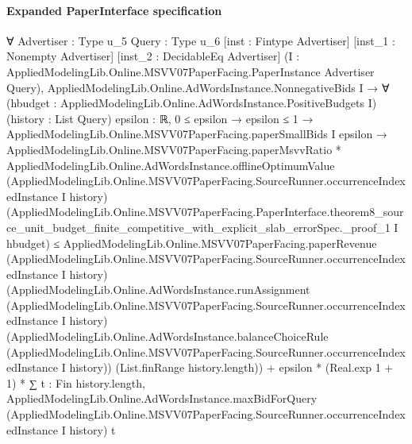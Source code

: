 \documentclass[10pt]{article}
\begin{document}
\paragraph{Expanded PaperInterface specification}
\begin{ReviewVerbatim}
∀ {Advertiser : Type u_5} {Query : Type u_6} [inst : Fintype Advertiser] [inst_1 : Nonempty Advertiser]
  [inst_2 : DecidableEq Advertiser] (I : AppliedModelingLib.Online.MSVV07PaperFacing.PaperInstance Advertiser Query),
  AppliedModelingLib.Online.AdWordsInstance.NonnegativeBids I →
    ∀ (hbudget : AppliedModelingLib.Online.AdWordsInstance.PositiveBudgets I) (history : List Query) {epsilon : ℝ},
      0 ≤ epsilon →
        epsilon ≤ 1 →
          AppliedModelingLib.Online.MSVV07PaperFacing.paperSmallBids I epsilon →
            AppliedModelingLib.Online.MSVV07PaperFacing.paperMsvvRatio *
                AppliedModelingLib.Online.AdWordsInstance.offlineOptimumValue
                  (AppliedModelingLib.Online.MSVV07PaperFacing.SourceRunner.occurrenceIndexedInstance I history)
                  (AppliedModelingLib.Online.MSVV07PaperFacing.PaperInterface.theorem8_source_unit_budget_finite_competitive_with_explicit_slab_errorSpec._proof_1
                    I hbudget) ≤
              AppliedModelingLib.Online.MSVV07PaperFacing.paperRevenue
                  (AppliedModelingLib.Online.MSVV07PaperFacing.SourceRunner.occurrenceIndexedInstance I history)
                  (AppliedModelingLib.Online.AdWordsInstance.runAssignment
                    (AppliedModelingLib.Online.MSVV07PaperFacing.SourceRunner.occurrenceIndexedInstance I history)
                    (AppliedModelingLib.Online.AdWordsInstance.balanceChoiceRule
                      (AppliedModelingLib.Online.MSVV07PaperFacing.SourceRunner.occurrenceIndexedInstance I history))
                    (List.finRange history.length)) +
                epsilon * (Real.exp 1 + 1) *
                  ∑ t : Fin history.length,
                    AppliedModelingLib.Online.AdWordsInstance.maxBidForQuery
                      (AppliedModelingLib.Online.MSVV07PaperFacing.SourceRunner.occurrenceIndexedInstance I history) t
\end{ReviewVerbatim}
\end{document}
